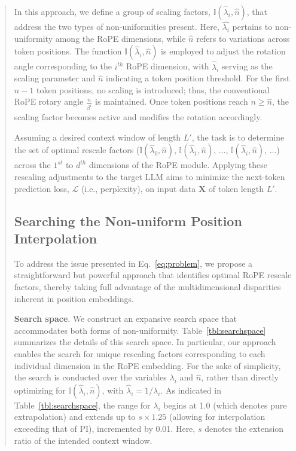 \begin{abstract}
In this approach, we define a group of scaling factors, $\mathbb{I}(\hat{\lambda}_{i},\hat{n})$, that address the two types of non-uniformities present. Here, $\hat{\lambda_i}$ pertains to non-uniformity among the RoPE dimensions, while $\hat{n}$ refers to variations across token positions. The function $\mathbb{I}(\hat{\lambda}_{i},\hat{n})$ is employed to adjust the rotation angle corresponding to the $i^{th}$ RoPE dimension, with $\hat{\lambda}_{i}$ serving as the scaling parameter and $\hat{n}$ indicating a token position threshold. For the first $\hat{n}-1$ token positions, no scaling is introduced; thus, the conventional RoPE rotary angle $\frac{n}{\beta^i}$ is maintained. Once token positions reach $n\geq \hat{n}$, the scaling factor becomes active and modifies the rotation accordingly.

Assuming a desired context window of length $L'$, the task is to determine the set of optimal rescale factors ($\mathbb{I}(\hat{\lambda}_{0},\hat{n})$, $\mathbb{I}(\hat{\lambda}_{1},\hat{n})$, ..., $\mathbb{I}(\hat{\lambda}_{i},\hat{n})$, ...) across the $1^{st}$ to $d^{th}$ dimensions of the RoPE module. Applying these rescaling adjustments to the target $\text{LLM}$ aims to minimize the next-token prediction loss, $\mathcal{L}$ (i.e., perplexity), on input data $\mathbf{X}$ of token length $L'$.

\subsection{Searching the Non-uniform Position Interpolation}

To address the issue presented in Eq.~\ref{eq:problem}, we propose a straightforward but powerful approach that identifies optimal RoPE rescale factors, thereby taking full advantage of the multidimensional disparities inherent in position embeddings.

\textbf{Search space}. We construct an expansive search space that accommodates both forms of non-uniformity. Table~\ref{tbl:searchspace} summarizes the details of this search space. In particular, our approach enables the search for unique rescaling factors corresponding to each individual dimension in the RoPE embedding. For the sake of simplicity, the search is conducted over the variables $\lambda_i$ and $\hat{n}$, rather than directly optimizing for $\mathbb{I}(\hat{\lambda}_{i},\hat{n})$, with $\hat{\lambda}_{i}=1/\lambda_i$. As indicated in Table~\ref{tbl:searchspace}, the range for $\lambda_i$ begins at 1.0 (which denotes pure extrapolation) and extends up to $s\times1.25$ (allowing for interpolation exceeding that of PI), incremented by 0.01. Here, $s$ denotes the extension ratio of the intended context window.


\end{abstract}
